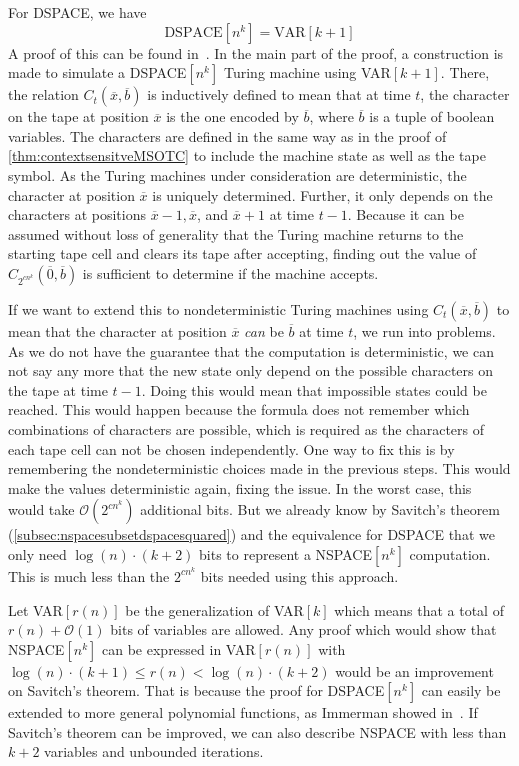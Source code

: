 For DSPACE, we have
\[
    \text{DSPACE}[n^k] = \text{VAR}[k + 1]
\]
A proof of this can be found in~\cite{descriptive-complexity}.
In the main part of the proof, a construction is made to simulate a DSPACE$[n^k]$ Turing machine using VAR$[k + 1]$.
There, the relation $C_{t}(\overline{x}, \overline{b})$ is inductively defined to mean that at time $t$, the character on the tape at position $\overline{x}$ is the one encoded by $\overline{b}$, where $\overline{b}$ is a tuple of boolean variables.
The characters are defined in the same way as in the proof of \cref{thm:contextsensitveMSOTC} to include the machine state as well as the tape symbol.
As the Turing machines under consideration are deterministic, the character at position $\overline{x}$ is uniquely determined.
Further, it only depends on the characters at positions $\overline{x} - 1, \overline{x}$, and $\overline{x} + 1$ at time $t - 1$.
Because it can be assumed without loss of generality that the Turing machine returns to the starting tape cell and clears its tape after accepting, finding out the value of $C_{2^{cn^k}}(\overline{0}, \overline{b})$ is sufficient to determine if the machine accepts.

If we want to extend this to nondeterministic Turing machines using $C_{t}(\overline{x}, \overline{b})$ to mean that the character at position $\overline{x}$ \emph{can} be $\overline{b}$ at time $t$, we run into problems.
As we do not have the guarantee that the computation is deterministic, we can not say any more that the new state only depend on the possible characters on the tape at time $t - 1$.
Doing this would mean that impossible states could be reached.
This would happen because the formula does not remember which combinations of characters are possible, which is required as the characters of each tape cell can not be chosen independently.
One way to fix this is by remembering the nondeterministic choices made in the previous steps.
This would make the values deterministic again, fixing the issue.
In the worst case, this would take $\mathcal{O}(2^{cn^k})$ additional bits.
But we already know by Savitch's theorem (\cref{subsec:nspacesubsetdspacesquared}) and the equivalence for DSPACE that we only need $\log(n) \cdot (k + 2)$ bits to represent a NSPACE$[n^k]$ computation.
This is much less than the $2^{cn^k}$ bits needed using this approach.

Let VAR$[r(n)]$ be the generalization of VAR$[k]$ which means that a total of $r(n) + \mathcal{O}(1)$ bits of variables are allowed.
Any proof which would show that NSPACE$[n^k]$ can be expressed in VAR$[r(n)]$ with $\log(n) \cdot (k + 1) \leq r(n) < \log(n) \cdot (k + 2)$ would be an improvement on Savitch's theorem.
That is because the proof for DSPACE$[n^k]$ can easily be extended to more general polynomial functions, as Immerman showed in~\cite{Immerman1999}.
If Savitch's theorem can be improved, we can also describe NSPACE with less than $k + 2$ variables and unbounded iterations.


